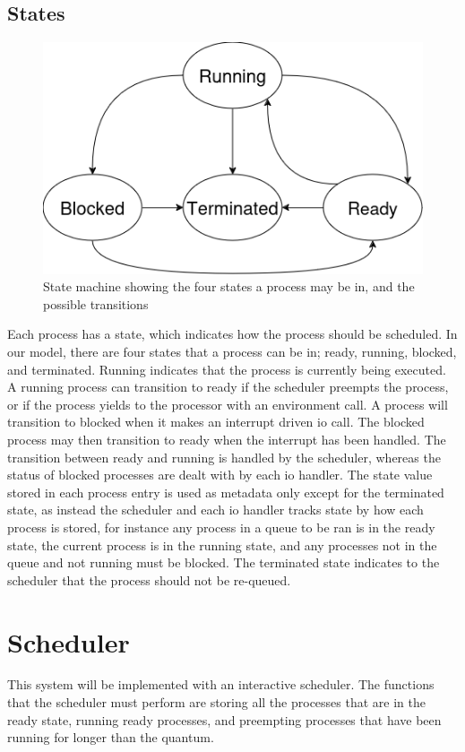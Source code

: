 \subsection{States}
\begin{figure}[H]
    \includegraphics[width=0.8\columnwidth]{figures/states.png}
    \centering
    \caption[State Diagram]{State machine showing the four states a process may be in, and the possible transitions}
\end{figure}
Each process has a state, which indicates how the process should be scheduled. In our model, there are four states that a process can be in; ready, running, blocked, and terminated. Running indicates that the process is currently being executed. A running process can transition to ready if the scheduler preempts the process, or if the process yields to the processor with an environment call. A process will transition to blocked when it makes an interrupt driven \ac{io} call. The blocked process may then transition to ready when the interrupt has been handled. The transition between ready and running is handled by the scheduler, whereas the status of blocked processes are dealt with by each \ac{io} handler. The state value stored in each process entry is used as metadata only except for the terminated state, as instead the scheduler and each \ac{io} handler tracks state by how each process is stored, for instance any process in a queue to be ran is in the ready state, the current process is in the running state, and any processes not in the queue and not running must be blocked. The terminated state indicates to the scheduler that the process should not be re-queued.
\section{Scheduler}
This system will be implemented with an interactive scheduler. The functions that the scheduler must perform are storing all the processes that are in the ready state, running ready processes, and preempting processes that have been running for longer than the \gls{quantum}.
